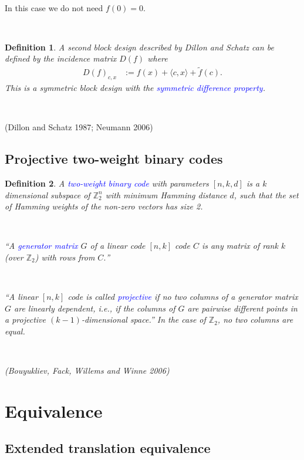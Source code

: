 \documentclass[12pt,a4paper]{article}
\newcommand{\mb}[1]{\mathbb{#1}}
\newcommand{\Z}{\mb{Z}}
\newcommand{\slidecite}[1]{\tiny{(#1)}\normalsize{}}
\newcommand{\Emph}[1]{\emph{\textcolor{blue}{#1}}}
\newcommand{\dual}[1]{\widetilde{#1}}
\newtheorem{Definition}{Definition}
\begin{document}
~

In this case we do not need $f(0)=0$.

~
\begin{Definition}
A second block design described by Dillon and Schatz can be defined by the incidence matrix $D(f)$ where
\begin{align*}
D(f)_{c,x} &:= f(x) + \langle c, x \rangle + \dual{f}(c).   
\end{align*}
This is a symmetric block design with the \Emph{symmetric difference property}.
\end{Definition}

~

\slidecite{Dillon and Schatz 1987; Neumann 2006}
\subsection*{Projective two-weight binary codes}

\begin{Definition}
A \Emph{two-weight binary code} with parameters $[n,k,d]$ is a $k$ dimensional subspace of $\Z_2^n$ with 
minimum Hamming distance $d$, such that the set of Hamming weights of the non-zero vectors has size 2.

~

``A \Emph{generator matrix} $G$ of a linear code $[n, k]$ code $C$ is any matrix
of rank $k$ (over $\Z_2$) with rows from $C.$''

~

``A linear $[n, k]$ code is called \Emph{projective} if no two columns of a generator matrix
$G$ are linearly dependent, i.e., if the columns of $G$ are pairwise different points in a
projective $(k-1)$-dimensional space.''
In the case of $\Z_2$, no two columns are equal.

~

\slidecite{Bouyukliev, Fack, Willems and Winne 2006} %

\end{Definition}

\section{Equivalence}

\subsection*{Extended translation equivalence}
\end{document}
